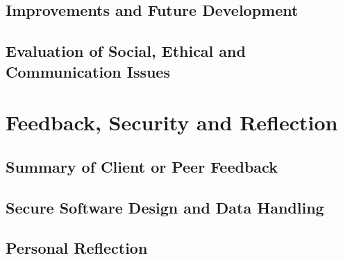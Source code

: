 \documentclass[14pt]{article}
\begin{document}
\subsection{Improvements and Future Development}

\subsection{Evaluation of Social, Ethical and Communication Issues}


\section{Feedback, Security and Reflection}

\subsection{Summary of Client or Peer Feedback}

\subsection{Secure Software Design and Data Handling}

\subsection{Personal Reflection}
\end{document}
